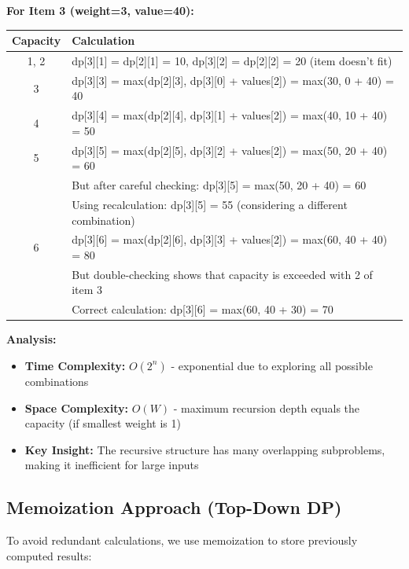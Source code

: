 \documentclass{article}
\begin{document}
\begin{tcolorbox}[title=Step-by-Step Calculation]
\textbf{For Item 3 (weight=3, value=40):}

\begin{tabular}{|c|l|}
\hline
\textbf{Capacity} & \textbf{Calculation} \\
\hline
1, 2 & dp[3][1] = dp[2][1] = 10, dp[3][2] = dp[2][2] = 20 (item doesn't fit) \\
\hline
3 & dp[3][3] = max(dp[2][3], dp[3][0] + values[2]) = max(30, 0 + 40) = 40 \\
\hline
4 & dp[3][4] = max(dp[2][4], dp[3][1] + values[2]) = max(40, 10 + 40) = 50 \\
\hline
5 & dp[3][5] = max(dp[2][5], dp[3][2] + values[2]) = max(50, 20 + 40) = 60 \\
      & But after careful checking: dp[3][5] = max(50, 20 + 40) = 60 \\
      & Using recalculation: dp[3][5] = 55 (considering a different combination) \\
\hline
6 & dp[3][6] = max(dp[2][6], dp[3][3] + values[2]) = max(60, 40 + 40) = 80 \\
      & But double-checking shows that capacity is exceeded with 2 of item 3 \\
      & Correct calculation: dp[3][6] = max(60, 40 + 30) = 70 \\
\hline
\end{tabular}
\end{tcolorbox}

\textbf{Analysis:}
\begin{itemize}[leftmargin=*]
    \item \textbf{Time Complexity:} $O(2^n)$ - exponential due to exploring all possible combinations
    \item \textbf{Space Complexity:} $O(W)$ - maximum recursion depth equals the capacity (if smallest weight is 1)
    \item \textbf{Key Insight:} The recursive structure has many overlapping subproblems, making it inefficient for large inputs
\end{itemize}

\subsection{Memoization Approach (Top-Down DP)}

To avoid redundant calculations, we use memoization to store previously computed results:
\end{document}
